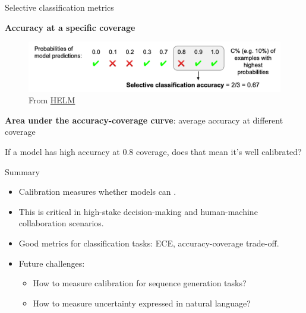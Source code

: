 \documentclass[usenames,dvipsnames,notes,11pt,aspectratio=169,hyperref={colorlinks=true, linkcolor=blue}]{beamer}
\begin{document}
\begin{frame}
    {Selective classification metrics}

    \textbf{Accuracy at a specific coverage}
    \begin{figure}
        \includegraphics[width=\textwidth]{figures/sel-class}
        \caption{From \href{https://arxiv.org/pdf/2211.09110.pdf}{HELM}}
    \end{figure}
    \pause

    \textbf{Area under the accuracy-coverage curve}: average accuracy at different coverage

    \pause
    If a model has high accuracy at 0.8 coverage, does that mean it's well calibrated?
\end{frame}

\begin{frame}
    {Summary}

    \begin{itemize}
        \item Calibration measures whether models can .
        \item This is critical in high-stake decision-making and human-machine collaboration scenarios.
            \pause
        \item Good metrics for classification tasks: ECE, accuracy-coverage trade-off.
        \item Future challenges:\\
            \begin{itemize}
                \item How to measure calibration for sequence generation tasks?
                \item How to measure uncertainty expressed in natural language?
            \end{itemize}
    \end{itemize}
\end{frame}
\end{document}
